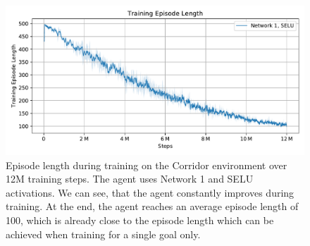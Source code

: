 \begin{figure}[htp]
    \begin{center}
        \includegraphics[clip, width=0.95\columnwidth]{figures/evaluation/randomness/goals/maze0318_episode_length_final.pdf}
    \end{center}
    \caption[Episode Length during 12M Training Steps on the Corridor Environment]{Episode length during training on the Corridor environment over 12M training steps. The agent uses Network 1 and SELU activations. We can see, that the agent constantly improves during training. At the end, the agent reaches an average episode length of 100, which is already close to the episode length which can be achieved when training for a single goal only.} \label{fig:Eval/RandomGoal/Maze0318}
\end{figure}


